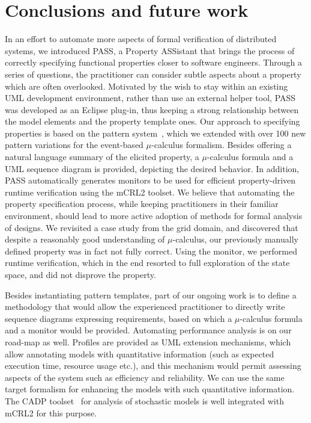 \documentclass[letter]{llncs}
\begin{document}
\section{Conclusions and future work}
\label{sec:Conclusions}
\vspace{-8 pt}
In an effort to automate more aspects of formal verification of distributed
systems, we introduced PASS, a Property ASSistant that brings the process of
correctly specifying 
functional properties closer to software engineers.
Through a series of questions, the practitioner can
consider subtle aspects about a property which are often overlooked.
Motivated by the wish to stay within an existing UML development environment,
rather than use an external helper tool, PASS was developed as an Eclipse plug-in,
thus keeping a strong relationship between the model elements and the property template ones.
Our approach to specifying properties is based on the pattern system~\cite{Dwyer:1999:PPS:302405.302672},
which we extended with over 100 new pattern variations for the event-based $\mu$-calculus
formalism. Besides offering a natural language summary of the elicited property,
a $\mu$-calculus formula and a UML sequence
diagram is provided, depicting the desired behavior. In addition, PASS
automatically generates monitors to be used for efficient property-driven 
runtime verification using the mCRL2 toolset. We believe that automating the property specification process, while keeping
practitioners in their familiar environment, should lead to more active adoption of methods for formal analysis of designs.
We revisited a case study from the grid domain, and discovered that 
despite a reasonably good understanding of $\mu$-calculus, our previously manually
defined property was in fact not fully correct. Using the monitor, we performed runtime verification, which in
the end resorted to full exploration of the state space, and did not disprove the property.

Besides instantiating pattern templates, part of our ongoing work is to define 
a methodology that would allow the experienced practitioner to directly 
write sequence diagrams expressing requirements, based on which a $\mu$-calculus formula and a monitor 
would be provided. Automating performance analysis is on our road-map as well. 
Profiles are provided as UML extension mechanisms, which allow 
annotating models with quantitative information (such as expected execution time, resource usage etc.),
and this mechanism would permit assessing aspects of the system
such as efficiency and reliability.
We can use the same target formalism for enhancing the models
with such quantitative information. The CADP toolset~\cite{DBLP:conf/tacas/GaravelLMS11} for analysis of stochastic
models is well integrated with mCRL2 for this purpose.
\vspace{-10 pt}
 
\vspace{-3 pt}

\end{document}
